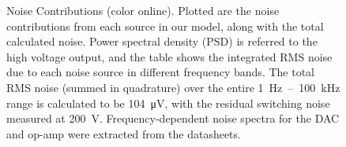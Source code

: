 \documentclass[aip,rsi,reprint]{revtex4-1} %
\begin{document}
\begin{figure}[t]

\caption{Noise Contributions (color online). Plotted are the noise contributions from each source in our model, along with the total calculated noise. Power spectral density (PSD) is referred to the high voltage output, and the table shows the integrated RMS noise due to each noise source in different frequency bands. The total RMS noise (summed in quadrature) over the entire \SI{1}{\hertz}~--~\SI{100}{\kilo\hertz} range is calculated to be \SI{104}{\micro\volt}, with the residual switching noise measured at \SI{200}{\volt}. Frequency-dependent noise spectra for the DAC and op-amp were extracted from the datasheets. \label{Fig:NoisePlot}}
\end{figure} 
\end{document}
